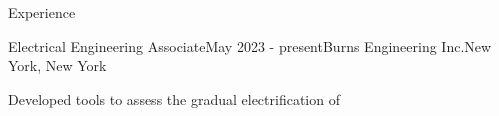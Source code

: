 \documentclass{resume}
\begin{document}

    \begin{rSection}{Experience}
        \begin{rSubsection}{Electrical Engineering Associate}{May 2023 - present}{Burns Engineering Inc.}{New York, New York}
            \item Developed tools to assess the gradual electrification of

\end{rSubsection}
\end{rSection}
\end{document}

